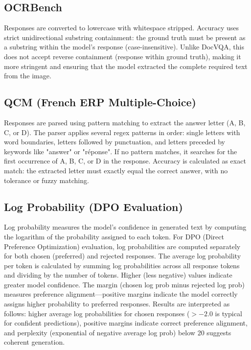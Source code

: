 \documentclass[10pt,conference,compsocconf]{IEEEtran}
\begin{document}
\subsection*{OCRBench}
Responses are converted to lowercase with whitespace stripped. Accuracy uses strict unidirectional substring containment: the ground truth must be present as a substring within the model's response (case-insensitive). Unlike DocVQA, this does not accept reverse containment (response within ground truth), making it more stringent and ensuring that the model extracted the complete required text from the image.

\subsection*{QCM (French ERP Multiple-Choice)}
Responses are parsed using pattern matching to extract the answer letter (A, B, C, or D). The parser applies several regex patterns in order: single letters with word boundaries, letters followed by punctuation, and letters preceded by keywords like "answer" or "réponse". If no pattern matches, it searches for the first occurrence of A, B, C, or D in the response. Accuracy is calculated as exact match: the extracted letter must exactly equal the correct answer, with no tolerance or fuzzy matching.

\subsection*{Log Probability (DPO Evaluation)}
Log probability measures the model's confidence in generated text by computing the logarithm of the probability assigned to each token. For DPO (Direct Preference Optimization) evaluation, log probabilities are computed separately for both chosen (preferred) and rejected responses. The average log probability per token is calculated by summing log probabilities across all response tokens and dividing by the number of tokens. Higher (less negative) values indicate greater model confidence. The margin (chosen log prob minus rejected log prob) measures preference alignment---positive margins indicate the model correctly assigns higher probability to preferred responses. Results are interpreted as follows: higher average log probabilities for chosen responses ($>-2.0$ is typical for confident predictions), positive margins indicate correct preference alignment, and perplexity (exponential of negative average log prob) below 20 suggests coherent generation.
\end{document}

